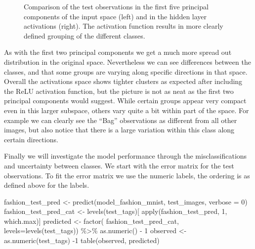 \documentclass[
  letterpaper,
]{krantz}
\newenvironment{Shaded}{\begin{snugshade}}{\end{snugshade}}
\newcommand{\AttributeTok}[1]{\textcolor[rgb]{0.40,0.45,0.13}{#1}}
\newcommand{\DecValTok}[1]{\textcolor[rgb]{0.68,0.00,0.00}{#1}}
\newcommand{\FunctionTok}[1]{\textcolor[rgb]{0.28,0.35,0.67}{#1}}
\newcommand{\NormalTok}[1]{\textcolor[rgb]{0.00,0.23,0.31}{#1}}
\newcommand{\OtherTok}[1]{\textcolor[rgb]{0.00,0.23,0.31}{#1}}
\newcommand{\SpecialCharTok}[1]{\textcolor[rgb]{0.37,0.37,0.37}{#1}}
\begin{document}
\begin{figure}
\begin{minipage}{0.50\linewidth}
\begin{figure}[H]
{}


\end{figure}%

\end{minipage}%
\newline
\begin{minipage}{0.50\linewidth}
Comparison of the test observations in the first five principal
components of the input space (left) and in the hidden layer activations
(right). The activation function results in more clearly defined
grouping of the different classes.\end{minipage}%

\end{figure}%

As with the first two principal components we get a much more spread out
distribution in the original space. Nevertheless we can see differences
between the classes, and that some groups are varying along specific
directions in that space. Overall the activations space shows tighter
clusters as expected after including the ReLU activation function, but
the picture is not as neat as the first two principal components would
suggest. While certain groups appear very compact even in this larger
subspace, others vary quite a bit within part of the space. For example
we can clearly see the ``Bag'' observations as different from all other
images, but also notice that there is a large variation within this
class along certain directions.

Finally we will investigate the model performance through the
misclassifications and uncertainty between classes. We start with the
error matrix for the test observations. To fit the error matrix we use
the numeric labels, the ordering is as defined above for the labels.

\begin{Shaded}
\begin{Highlighting}[]
\NormalTok{fashion\_test\_pred }\OtherTok{\textless{}{-}} \FunctionTok{predict}\NormalTok{(model\_fashion\_mnist,}
\NormalTok{                             test\_images, }\AttributeTok{verbose =} \DecValTok{0}\NormalTok{)}
\NormalTok{fashion\_test\_pred\_cat }\OtherTok{\textless{}{-}} \FunctionTok{levels}\NormalTok{(test\_tags)[}
  \FunctionTok{apply}\NormalTok{(fashion\_test\_pred, }\DecValTok{1}\NormalTok{,}
\NormalTok{        which.max)]}
\NormalTok{predicted }\OtherTok{\textless{}{-}} \FunctionTok{factor}\NormalTok{(}
\NormalTok{  fashion\_test\_pred\_cat,}
  \AttributeTok{levels=}\FunctionTok{levels}\NormalTok{(test\_tags)) }\SpecialCharTok{\%\textgreater{}\%}
  \FunctionTok{as.numeric}\NormalTok{() }\SpecialCharTok{{-}} \DecValTok{1}
\NormalTok{observed }\OtherTok{\textless{}{-}} \FunctionTok{as.numeric}\NormalTok{(test\_tags) }\SpecialCharTok{{-}}\DecValTok{1}
\FunctionTok{table}\NormalTok{(observed, predicted)}
\end{Highlighting}
\end{Shaded}
\end{document}

